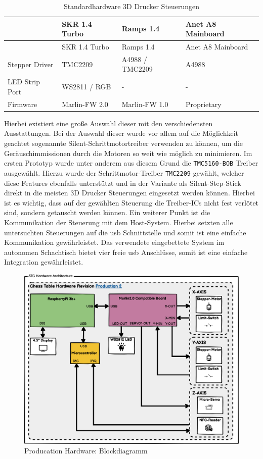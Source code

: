 \begin{longtable}[]{@{}llll@{}}
\caption{Standardhardware 3D Drucker Steuerungen}\tabularnewline
\toprule
& SKR 1.4 Turbo & Ramps 1.4 & Anet A8 Mainboard\tabularnewline
\midrule
\endfirsthead
\toprule
& SKR 1.4 Turbo & Ramps 1.4 & Anet A8 Mainboard\tabularnewline
\midrule
\endhead
Stepper Driver & TMC2209 & A4988 / TMC2209 & A4988\tabularnewline
LED Strip Port & WS2811 / RGB & - & -\tabularnewline
Firmware & Marlin-FW 2.0 & Marlin-FW 1.0 & Proprietary\tabularnewline
\bottomrule
\end{longtable}

Hierbei existiert eine große Auswahl dieser mit den verschiedensten
Ausstattungen. Bei der Auswahl dieser wurde vor allem auf die
Möglichkeit geachtet sogenannte Silent-Schrittmotortreiber verwenden zu
können, um die Geräuschimmissionen durch die Motoren so weit wie möglich
zu minimieren. Im ersten Prototyp wurde unter anderem aus diesem Grund
die \passthrough{\lstinline!TMC5160-BOB!} Treiber ausgewählt. Hierzu
wurde der Schrittmotor-Treiber \passthrough{\lstinline!TMC2209!}
gewählt, welcher diese Features ebenfalls unterstützt und in der
Variante als Silent-Step-Stick direkt in die meisten 3D Drucker
Steuerungen eingesetzt werden können. Hierbei ist es wichtig, dass auf
der gewählten Steuerung die Treiber-ICs nicht fest verlötet sind,
sondern getauscht werden können. Ein weiterer Punkt ist die
Kommunikation der Steuerung mit dem Host-System. Hierbei setzten alle
untersuchten Steuerungen auf die \gls{usb} Schnittstelle und somit ist
eine einfache Kommunikation gewährleistet. Das verwendete eingebettete
System im autonomen Schachtisch bietet vier freie \gls{usb} Anschlüsse,
somit ist eine einfache Integration gewährleistet.

\begin{figure}
\centering
\includegraphics{images/ATC_Hardware_Architecture_PROD.png}
\caption{Producation Hardware: Blockdiagramm
\label{ATC_Hardware_Architecture_PROD}}
\end{figure}

